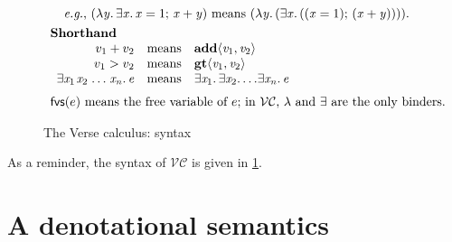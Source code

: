 \documentclass[acmsmall,review,dvipsnames]{acmart}
\newcommand{\Varid}[1]{\mathit{#1}}
\renewcommand{\geq}{\geqslant}
\newcommand{\eg}{\emph{e.g.}}
\newcommand{\versecalc}{$\mathcal{VC}$}
\newcommand{\freevars}[1]{\mathsf{fvs}(#1)}
\newcommand{\disjoint}{\;\#\;}
\begin{document}
\begin{figure}
$$\begin{array}{l}
\begin{array}[t]{l}
          \hspace{2mm} \text{{\eg}, \ensuremath{(\lambda\Varid{y}.\,\exists\Varid{x}.\,\Varid{x}\mathrel{=}\mathrm{1};\,\Varid{x}\mathbin{+}\Varid{y})} means \ensuremath{(\lambda\Varid{y}.\,(\exists\Varid{x}.\,((\Varid{x}\mathrel{=}\mathrm{1});\,(\Varid{x}\mathbin{+}\Varid{y}))))}.}
    \end{array} \\ \\[-3mm]
    \textbf{Shorthand} \\
    \begin{array}{rcl}
      v_1 + v_2 & \text{means} & \ensuremath{\textbf{add}\langle\Varid{v}_{\mathrm{1}},\Varid{v}_{\mathrm{2}}\rangle} \\
      v_1 > v_2 & \text{means} & \ensuremath{\textbf{gt}\langle\Varid{v}_{\mathrm{1}},\Varid{v}_{\mathrm{2}}\rangle} \\
      \ensuremath{\exists\Varid{x}_{\mathrm{1}}\hspace{0.1em}\Varid{x}_{\mathrm{2}}\;\!\ldots\!\;\Varid{x}_{\Varid{n}}.\,\Varid{e}} & \text{means} & \ensuremath{\exists\Varid{x}_{\mathrm{1}}.\,\exists\Varid{x}_{\mathrm{2}}.\,\!\ldots\! \exists\Varid{x}_{\Varid{n}}.\,\Varid{e}} \\
     \end{array} \\
  \\[-2mm]
  \text{$\freevars{e}$ means the free variable of $e$; in \versecalc{}, $\lambda$ and \ensuremath{\exists{}} are the only binders.}
  \end{array}
  $$
\caption{The Verse calculus: syntax} \label{fig:syntax}
\end{figure}

As a reminder, the syntax of \versecalc{} is given in \cref{fig:syntax}.

\section{A denotational semantics}

\newcommand{\sconcat}{\bowtie}
\newcommand{\shead}{\mathit{head}}
\newcommand{\stuple}{\mathit{tuple}}
\newcommand{\scons}{:}
\end{document}
